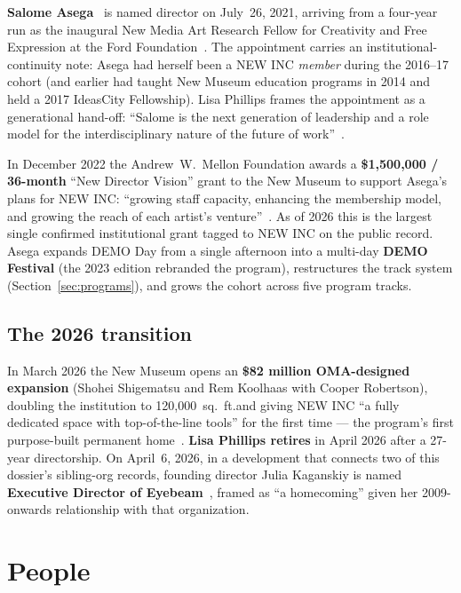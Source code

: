 \documentclass[10pt,letterpaper,twocolumn]{article}
\begin{document}
\textbf{Salome Asega}~\citep{wikipedia2026asega} is named director on July~26, 2021, arriving from a four-year run as the inaugural New Media Art Research Fellow for Creativity and Free Expression at the Ford Foundation~\citep{artforum2021asega}. The appointment carries an institutional-continuity note: Asega had herself been a NEW INC \emph{member} during the 2016--17 cohort (and earlier had taught New Museum education programs in 2014 and held a 2017 IdeasCity Fellowship). Lisa Phillips frames the appointment as a generational hand-off: ``Salome is the next generation of leadership and a role model for the interdisciplinary nature of the future of work''~\citep{artforum2021asega}.

In December 2022 the Andrew~W.~Mellon Foundation awards a \textbf{\$1,500,000 / 36-month} ``New Director Vision'' grant to the New Museum to support Asega's plans for NEW INC: ``growing staff capacity, enhancing the membership model, and growing the reach of each artist's venture''~\citep{mellon2022newinc}. As of 2026 this is the largest single confirmed institutional grant tagged to NEW INC on the public record. Asega expands DEMO Day from a single afternoon into a multi-day \textbf{DEMO Festival} (the 2023 edition rebranded the program), restructures the track system (Section~\ref{sec:programs}), and grows the cohort across five program tracks.

\subsection{The 2026 transition}

In March 2026 the New Museum opens an \textbf{\$82 million OMA-designed expansion} (Shohei Shigematsu and Rem Koolhaas with Cooper Robertson), doubling the institution to 120,000~sq.~ft.\@ and giving NEW INC ``a fully dedicated space with top-of-the-line tools'' for the first time --- the program's first purpose-built permanent home~\citep{theartnewspaper2026expansion}. \textbf{Lisa Phillips retires} in April 2026 after a 27-year directorship. On April~6, 2026, in a development that connects two of this dossier's sibling-org records, founding director Julia Kaganskiy is named \textbf{Executive Director of Eyebeam}~\citep{eyebeam2026kaganskiy}, framed as ``a homecoming'' given her 2009-onwards relationship with that organization.

\section{People}
\end{document}
